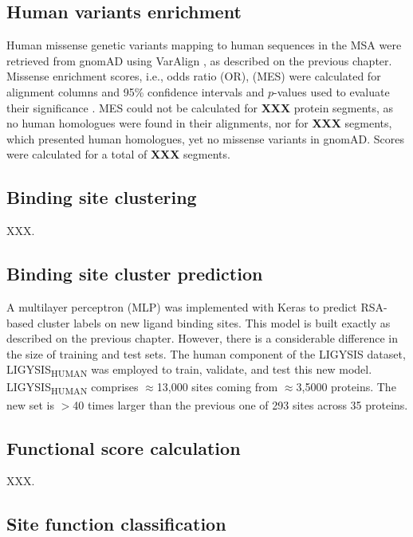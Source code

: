 \subsection{Human variants enrichment}

Human missense genetic variants mapping to human sequences in the MSA were retrieved from gnomAD \cite{KARCZEWSKI_2020_GNOMAD} using VarAlign \cite{MACGOWAN_2017_VARIANTS, MACGOWAN_2024_VARIANTS}, as described on the previous chapter. Missense enrichment scores, i.e., odds ratio (OR), (MES) were calculated for alignment columns and 95\% confidence intervals and $p$-values used to evaluate their significance \cite{SZUMILAS_2010_ODDSRATIOS}. MES could not be calculated for \textbf{XXX} protein segments, as no human homologues were found in their alignments, nor for \textbf{XXX} segments, which presented human homologues, yet no missense variants in gnomAD. Scores were calculated for a total of \textbf{XXX} segments.

\subsection{Binding site clustering}

XXX.

\subsection{Binding site cluster prediction}

A multilayer perceptron (MLP) was implemented with Keras \cite{CHOLLET_2015_KERAS} to predict RSA-based cluster labels on new ligand binding sites. This model is built exactly as described on the previous chapter. However, there is a considerable difference in the size of training and test sets. The human component of the LIGYSIS dataset, LIGYSIS\textsubscript{HUMAN} was employed to train, validate, and test this new model. LIGYSIS\textsubscript{HUMAN} comprises $\approx$13,000 sites coming from $\approx$3,5000 proteins. The new set is $>$40 times larger than the previous one of 293 sites across 35 proteins.

\subsection{Functional score calculation}

XXX.

\subsection{Site function classification}

